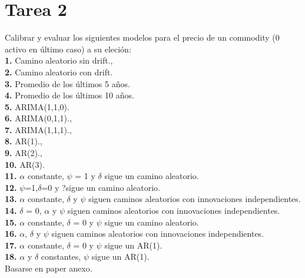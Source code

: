 \pagebreak\section{Tarea 2}
\begin{mdframed}[style=MyFrame]
Calibrar y evaluar los siguientes modelos para el precio de un commodity (0 activo en \'ultimo caso) a su eleci\'on:\\
\textbf{1.} Camino aleatorio sin drift.,\\
\textbf{2.} Camino aleatorio con drift.\\
\textbf{3.} Promedio de los \'ultimos 5 a\~nos.\\ 
\textbf{4.} Promedio de los \'ultimos 10 a\~nos.\\
\textbf{5.} ARIMA(1,1,0).\\
\textbf{6.} ARIMA(0,1,1).,\\ 
\textbf{7.} ARIMA(1,1,1).,\\ 
\textbf{8.} AR(1).,\\ 
\textbf{9.} AR(2).,\\
\textbf{10.} AR(3).\\
\textbf{11.} $\alpha$ constante, $\psi$ = 1 y $\delta$ sigue un camino aleatorio.\\
\textbf{12.} $\psi$=1,$\delta$=0 y ?sigue un camino aleatorio.\\
\textbf{13.} $\alpha$ constante, $\delta$ y $\psi$ siguen caminos aleatorios con innovaciones independientes.\\
\textbf{14.} $\delta$ = 0, $\alpha$ y $\psi$ siguen caminos aleatorios con innovaciones independientes.\\ 
\textbf{15.} $\alpha$ constante, $\delta$ = 0 y $\psi$ sigue un camino aleatorio.\\
\textbf{16.} $\alpha$, $\delta$ y $\psi$ siguen caminos aleatorios con innovaciones independientes.\\
\textbf{17.} $\alpha$ constante, $\delta$ = 0 y $\psi$ sigue un AR(1).\\
\textbf{18.} $\alpha$ y $\delta$ constantes, $\psi$ sigue un AR(1).\\
\vspace{4mm}	
Basarse en paper anexo.
\end{mdframed}






